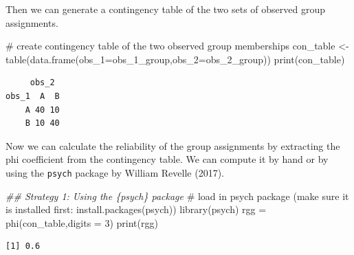 \documentclass[
  letterpaper,
  DIV=11,
  numbers=noendperiod]{scrreprt}
\newenvironment{Shaded}{\begin{snugshade}}{\end{snugshade}}
\newcommand{\AttributeTok}[1]{\textcolor[rgb]{0.40,0.45,0.13}{#1}}
\newcommand{\CommentTok}[1]{\textcolor[rgb]{0.37,0.37,0.37}{#1}}
\newcommand{\DecValTok}[1]{\textcolor[rgb]{0.68,0.00,0.00}{#1}}
\newcommand{\DocumentationTok}[1]{\textcolor[rgb]{0.37,0.37,0.37}{\textit{#1}}}
\newcommand{\FunctionTok}[1]{\textcolor[rgb]{0.28,0.35,0.67}{#1}}
\newcommand{\NormalTok}[1]{\textcolor[rgb]{0.00,0.23,0.31}{#1}}
\newcommand{\OtherTok}[1]{\textcolor[rgb]{0.00,0.23,0.31}{#1}}
\begin{document}
Then we can generate a contingency table of the two sets of observed
group assignments.

\begin{Shaded}
\begin{Highlighting}[]
\CommentTok{\# create contingency table of the two observed group memberships}
\NormalTok{con\_table }\OtherTok{\textless{}{-}} \FunctionTok{table}\NormalTok{(}\FunctionTok{data.frame}\NormalTok{(}\AttributeTok{obs\_1=}\NormalTok{obs\_1\_group,}\AttributeTok{obs\_2=}\NormalTok{obs\_2\_group))}
\FunctionTok{print}\NormalTok{(con\_table)}
\end{Highlighting}
\end{Shaded}

\begin{verbatim}
     obs_2
obs_1  A  B
    A 40 10
    B 10 40
\end{verbatim}

Now we can calculate the reliability of the group assignments by
extracting the phi coefficient from the contingency table. We can
compute it by hand or by using the \texttt{psych} package by William
Revelle (2017).

\begin{Shaded}
\begin{Highlighting}[]
\DocumentationTok{\#\# Strategy 1: Using the \{psych\} package}
\CommentTok{\# load in psych package (make sure it is installed first: install.packages(\textquotesingle{}psych\textquotesingle{}))}
\FunctionTok{library}\NormalTok{(psych)}
\NormalTok{rgg }\OtherTok{=} \FunctionTok{phi}\NormalTok{(con\_table,}\AttributeTok{digits =} \DecValTok{3}\NormalTok{)}
\FunctionTok{print}\NormalTok{(rgg)}
\end{Highlighting}
\end{Shaded}

\begin{verbatim}
[1] 0.6
\end{verbatim}
\end{document}
